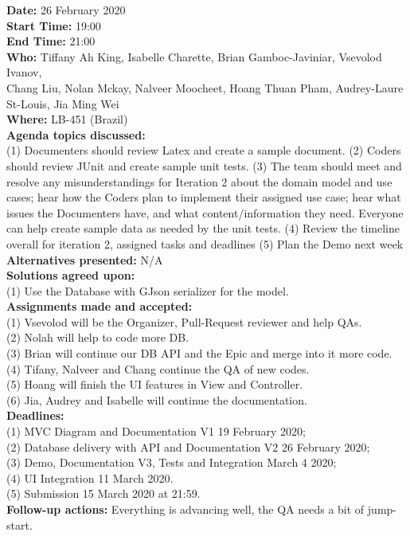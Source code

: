 \documentclass[12pt]{article}
\begin{document}
\newpage

{\bf Date:} 26 February 2020\\
{\bf Start Time:} 19:00\\
{\bf End Time:} 21:00\\
{\bf Who:} Tiffany Ah King, Isabelle Charette, Brian Gamboc-Javiniar, Vsevolod Ivanov,\\
Chang Liu, Nolan Mckay, Nalveer Moocheet, Hoang Thuan Pham, Audrey-Laure St-Louis, Jia Ming Wei\\
{\bf Where:} LB-451 (Brazil)\\
{\bf Agenda topics discussed:} \\
(1) Documenters should review Latex and create a sample document.
(2) Coders should review JUnit and create sample unit tests.
(3) The team should meet and resolve any misunderstandings for Iteration 2 about the domain model and use cases; hear how the Coders plan to implement their assigned use case; hear what issues the Documenters have, and what content/information they need. Everyone can help create sample data as needed by the unit tests.
(4) Review the timeline overall for iteration 2, assigned tasks and deadlines
(5) Plan the Demo next week
{\bf Alternatives presented:} N/A\\
{\bf Solutions agreed upon:} \\
(1) Use the Database with GJson serializer for the model. \\
{\bf Assignments made and accepted:} \\
(1) Vsevolod will be the Organizer, Pull-Request reviewer and help QAs.\\
(2) Nolah will help to code more DB.\\
(3) Brian will continue our DB API and the Epic and merge into it more code.\\
(4) Tifany, Nalveer and Chang continue the QA of new codes.\\
(5) Hoang will finish the UI features in View and Controller.\\
(6) Jia, Audrey and Isabelle will continue the documentation.\\
{\bf Deadlines:} \\
(1) MVC Diagram and Documentation V1 19 February 2020;\\
(2) Database delivery with API and Documentation V2 26 February 2020;\\
(3) Demo, Documentation V3, Tests and Integration March 4 2020; \\
(4) UI Integration 11 March 2020. \\
(5) Submission 15 March 2020 at 21:59. \\
{\bf Follow-up actions:} Everything is advancing well, the QA needs a bit of jump-start.\\
\end{document}
